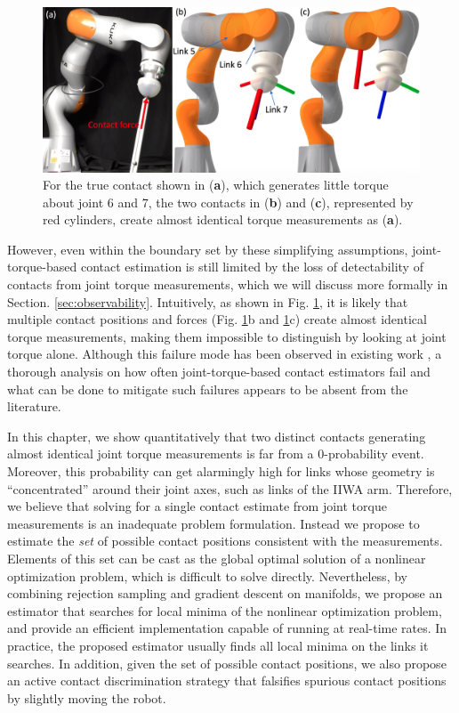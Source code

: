 \begin{figure}
\centering
\includegraphics[width=0.9\linewidth]{figures/05_force_from_torque/cpf_failure.png}
\caption{For the true contact shown in (\textbf{a}), which generates little torque about joint 6 and 7, the two contacts in (\textbf{b}) and  (\textbf{c}), represented by red cylinders, create almost identical torque measurements as (\textbf{a}).}
\label{fig:cpf_failure}
\end{figure}

However, even within the boundary set by these simplifying assumptions, joint-torque-based contact estimation is still limited by the loss of detectability of contacts from joint torque measurements, which we will discuss more formally in Section. \ref{sec:observability}. Intuitively, as shown in Fig. \ref{fig:cpf_failure}, it is likely that multiple contact positions and forces (Fig. \ref{fig:cpf_failure}b and \ref{fig:cpf_failure}c) create almost identical torque measurements, making them impossible to distinguish by looking at joint torque alone. Although this failure mode has been observed in existing work \cite{zwiener2018contact}, a thorough analysis on how often joint-torque-based contact estimators fail and what can be done to mitigate such failures appears to be absent from the literature. 

In this chapter, we show quantitatively that two distinct contacts generating almost identical joint torque measurements is far from a 0-probability event. Moreover, this probability can get alarmingly high for links whose geometry is ``concentrated'' around their joint axes, such as links of the IIWA arm. Therefore, we believe that solving for a single contact estimate from joint torque measurements is an inadequate problem formulation. Instead we propose to estimate the \emph{set} of possible contact positions consistent with the measurements.  Elements of this set can be cast as the global optimal solution of a nonlinear optimization problem, which is difficult to solve directly. Nevertheless, by combining rejection sampling and gradient descent on manifolds, we propose an estimator that searches for local minima of the nonlinear optimization problem, and provide an efficient implementation capable of running at real-time rates. In practice, the proposed estimator usually finds all local minima on the links it searches. In addition, given the set of possible contact positions, we also propose an active contact discrimination strategy that falsifies spurious contact positions by slightly moving the robot.


